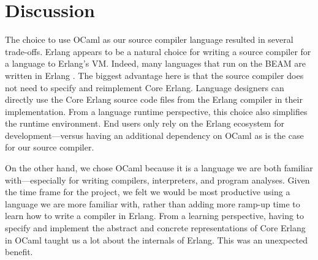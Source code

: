 \section{Discussion}
\label{sec:discussion}

The choice to use OCaml as our source compiler language resulted in several trade-offs. 
Erlang appears to be a natural choice for writing a source compiler for a language to Erlang's VM. 
Indeed, many languages that run on the BEAM are written in Erlang \cite{}. 
The biggest advantage here is that the source compiler does not need to specify and reimplement Core Erlang. 
Language designers can directly use the Core Erlang source code files from the Erlang compiler in their implementation. 
From a language runtime perspective, this choice also simplifies the runtime environment. 
End users only rely on the Erlang ecosystem for development---versus having an additional dependency on OCaml as is the case for our source compiler.

On the other hand, we chose OCaml because it is a language we are both familiar with---especially for writing compilers, interpreters, and program analyses. 
Given the time frame for the project, we felt we would be most productive using a language we are more familiar with, rather than adding more ramp-up time to learn how to write a compiler in Erlang. 
From a learning perspective, having to specify and implement the abstract and concrete representations of Core Erlang in OCaml taught us a lot about the internals of Erlang. 
This was an unexpected benefit. 
